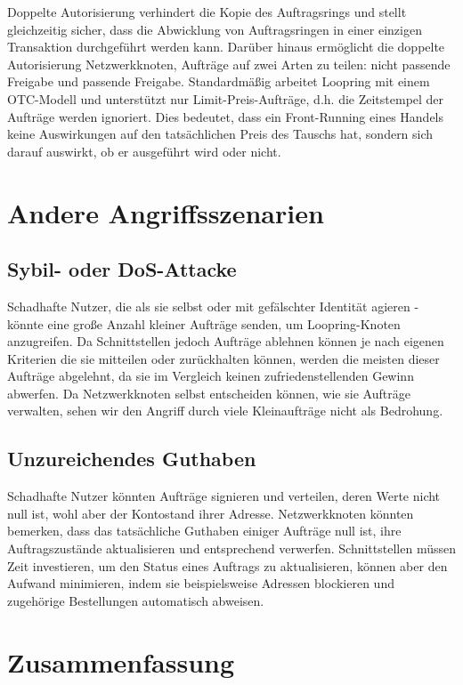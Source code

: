 \documentclass[UTF8,nofonts]{article}
\begin{document}
\begin{multicols}{2}
\begin{itemize}
\end{itemize}

Doppelte Autorisierung verhindert die Kopie des Auftragsrings und stellt gleichzeitig sicher, dass die Abwicklung von Auftragsringen in einer einzigen Transaktion durchgeführt werden kann. Darüber hinaus ermöglicht die doppelte Autorisierung Netzwerkknoten, Aufträge auf zwei Arten zu teilen: nicht passende Freigabe und passende Freigabe. Standardmäßig arbeitet Loopring mit einem OTC-Modell und unterstützt nur Limit-Preis-Aufträge, d.h. die Zeitstempel der Aufträge werden ignoriert. Dies bedeutet, dass ein Front-Running eines Handels keine Auswirkungen auf den tatsächlichen Preis des Tauschs hat, sondern sich darauf auswirkt, ob er ausgeführt wird oder nicht.

\section{Andere Angriffsszenarien}

\subsection{Sybil- oder DoS-Attacke}
Schadhafte Nutzer, die als sie selbst oder mit gefälschter Identität agieren - könnte eine große Anzahl kleiner Aufträge senden, um Loopring-Knoten anzugreifen. Da Schnittstellen jedoch Aufträge ablehnen können je nach eigenen Kriterien die sie mitteilen oder zurückhalten können, werden die meisten dieser Aufträge abgelehnt, da sie im Vergleich keinen zufriedenstellenden Gewinn abwerfen. Da Netzwerkknoten selbst entscheiden können, wie sie Aufträge verwalten, sehen wir den Angriff durch viele Kleinaufträge nicht als Bedrohung.

\subsection{Unzureichendes Guthaben}
Schadhafte Nutzer könnten Aufträge signieren und verteilen, deren Werte nicht null ist, wohl aber der Kontostand ihrer Adresse. Netzwerkknoten könnten bemerken, dass das tatsächliche Guthaben einiger Aufträge null ist, ihre Auftragszustände aktualisieren und entsprechend verwerfen. Schnittstellen müssen Zeit investieren, um den Status eines Auftrags zu aktualisieren, können aber den Aufwand minimieren, indem sie beispielsweise Adressen blockieren und zugehörige Bestellungen automatisch abweisen.

\section{Zusammenfassung}


\end{multicols}
\end{document}
